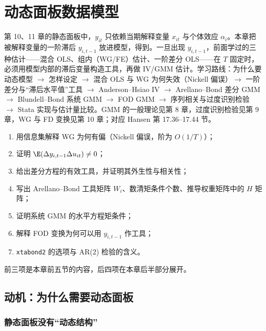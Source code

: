 \chapter{动态面板数据模型}
\label{ch:U12a-dynpanel}

第 10、11 章的静态面板中，$y_{it}$ 只依赖当期解释变量 $x_{it}$ 与个体效应 $\alpha_i$。本章把被解释变量的一阶滞后 $y_{i,t-1}$ 放进模型，得到。一旦出现 $y_{i,t-1}$，前面学过的三种估计——混合 OLS、组内（WG/FE）估计、一阶差分 OLS——在 $T$ 固定时，必须用模型内部的滞后变量构造工具，再做 IV/GMM 估计。学习路线：为什么要动态模型 $\to$ 怎样设定 $\to$ 混合 OLS 与 WG 为何失效（Nickell 偏误）$\to$ 一阶差分与“滞后水平值”工具 $\to$ Anderson–Hsiao IV $\to$ Arellano–Bond 差分 GMM $\to$ Blundell–Bond 系统 GMM $\to$ FOD GMM $\to$ 序列相关与过度识别检验 $\to$ Stata 实现与估计量比较。GMM 的一般理论见第 8 章，过度识别检验见第 9 章，WG 与 FD 变换见第 10 章；对应 Hansen 第 17.36–17.44 节。

\begin{keypt}[本章高频考点]
\begin{enumerate}
  \item 用信息集解释 WG 为何有偏（Nickell 偏误，阶为 $O(1/T)$）；
  \item 证明 $\E(\Delta y_{i,t-1}\Delta u_{it})\neq0$；
  \item 给出差分方程的有效工具，并证明其外生性与相关性；
  \item 写出 Arellano–Bond 工具矩阵 $W_i$、数清矩条件个数、推导权重矩阵中的 $H$ 矩阵；
  \item 证明系统 GMM 的水平方程矩条件；
  \item 解释 FOD 变换为何可以用 $y_{i,t-1}$ 作工具；
  \item \texttt{xtabond2} 的选项与 AR(2) 检验的含义。
\end{enumerate}
前三项是本章前五节的内容，后四项在本章后半部分展开。
\end{keypt}

\section{动机：为什么需要动态面板}\label{sec:U12a-motive}

\subsection{静态面板没有“动态结构”}

